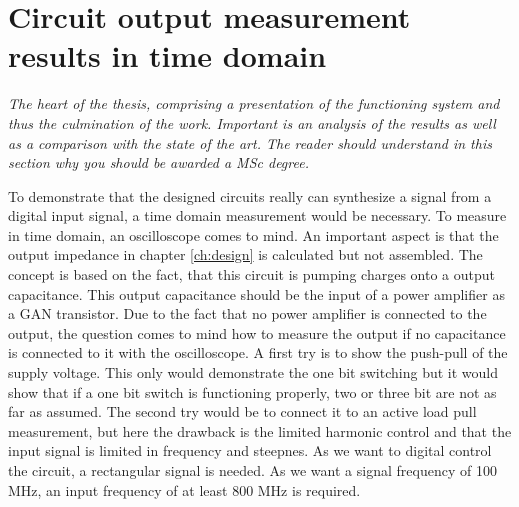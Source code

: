\chapter{Circuit output measurement results in time domain}
\textit{The heart of the thesis, comprising a presentation of the functioning system and thus the culmination of the work. Important is an analysis of the results as well as a comparison with the state of the art. The reader should understand in this section why you should be awarded a MSc degree.}

To demonstrate that the designed circuits really can synthesize a signal from a digital input signal, a time domain measurement would be necessary.
To measure in time domain, an oscilloscope comes to mind.
An important aspect is that the output impedance in chapter \ref{ch:design} is calculated but not assembled. 
The concept is based on the fact, that this circuit is pumping charges onto a output capacitance.
This output capacitance should be the input of a power amplifier as a GAN transistor.
Due to the fact that no power amplifier is connected to the output, the question comes to mind how to measure the output if no capacitance is connected to it with the oscilloscope.
A first try is to show the push-pull of the supply voltage. 
This only would demonstrate the one bit switching but it would show that if a one bit switch is functioning properly, two or three bit are not as far as assumed.
The second try would be to connect it to an active load pull measurement, but here the drawback is the limited harmonic control and that the input signal is limited in frequency and steepnes. 
As we want to digital control the circuit, a rectangular signal is needed.
As we want a signal frequency of 100 MHz, an input frequency of at least 800 MHz is required.\\

